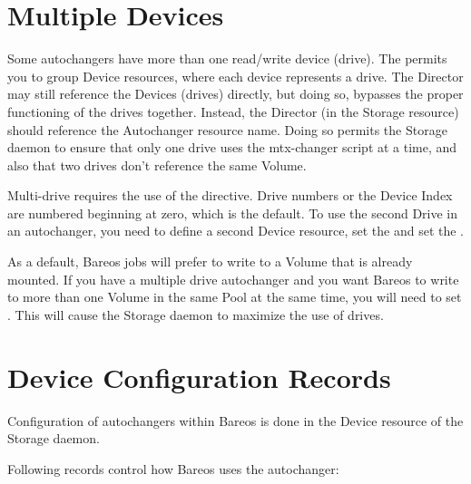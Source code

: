 \section{Multiple Devices}
\label{sec:MultipleDevices}

Some autochangers have more than one read/write device (drive). The
 permits you to group Device resources, where each device
represents a drive. The Director may still reference the Devices (drives)
directly, but doing so, bypasses the proper functioning of the
drives together.  Instead, the Director (in the Storage resource)
should reference the Autochanger resource name. Doing so permits
the Storage daemon to ensure that only one drive uses the mtx-changer
script at a time, and also that two drives don't reference the
same Volume.

Multi-drive requires the use of the  directive.
Drive numbers or the Device Index are numbered beginning
at zero, which is the default. To use the second Drive in an autochanger, you
need to define a second Device resource, set the 
and set the .

As a default, Bareos jobs will prefer to write to a Volume that is
already mounted. If you have a multiple drive autochanger and you want
Bareos to write to more than one Volume in the same Pool at the same
time, you will need to set .
This will cause the Storage daemon to maximize the use of drives.



\section{Device Configuration Records}

Configuration of autochangers within Bareos is done in the Device resource of
the Storage daemon.

Following records control how Bareos uses the autochanger:


